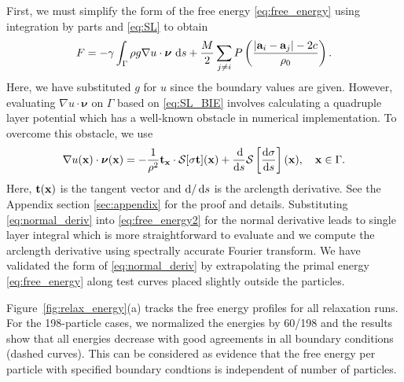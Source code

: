 \documentclass[prb,preprint,showpacs,preprintnumbers,amsmath,amssymb,longbibliography]{revtex4-1}
\renewcommand{\aa}{\mathbf{a}}
\newcommand{\DD}{\mathcal{D}}
\newcommand{\SSS}{\mathcal{S}}
\newcommand{\nnu}{\boldsymbol{\nu}}
\newcommand{\xx}{\mathbf{x}}
\begin{document}
First, we must simplify the
form of the free energy \eqref{eq:free_energy}
using integration by parts and \eqref{eq:SL}
to obtain
\begin{equation}
\label{eq:free_energy2}
F = -\gamma
\int_{\Gamma} \rho g \nabla u \cdot \nnu \,\dif s
+ \frac{M}{2}
\sum_{j \neq i} 
P\left(\frac{|\aa_i - \aa_j|-2c}{\rho_0}\right).
\end{equation}
%
Here, we have substituted $g$ for $u$ since the boundary values are given.
However, evaluating $\nabla u \cdot \nnu$ on $\Gamma$ based on \eqref{eq:SL_BIE}
involves calculating a quadruple layer potential which has a
well-known obstacle in numerical implementation.
To overcome this obstacle, we use
%
\begin{equation}
\label{eq:normal_deriv}
\nabla u(\xx) \cdot \nnu(\xx)=
-\frac{1}{\rho^2} {\bf t}_\xx\cdot \SSS[\sigma{\bf t}](\xx)
+ \frac{\dif}{\dif s}\SSS\left[\frac{\dif \sigma}{\dif s}\right](\xx), \quad \xx \in \Gamma.
\end{equation}
%
Here, ${\bf t}(\xx)$ is the tangent vector and $\dif/\dif s$ is the arclength derivative.
See the Appendix section \ref{sec:appendix} for the proof and details.
Substituting \eqref{eq:normal_deriv} into \eqref{eq:free_energy2} for the normal derivative
leads to single layer integral which is more straightforward to evaluate and we compute the
arclength derivative using spectrally accurate Fourier transform.
We have validated the form of \eqref{eq:normal_deriv} by extrapolating 
the primal energy \eqref{eq:free_energy} along test curves placed slightly
outside the particles. 

Figure~\ref{fig:relax_energy}(a) tracks the free energy profiles for all relaxation runs.
For the 198-particle cases, we normalized the energies by 60/198 and the results
show that all energies decrease with good agreements in all boundary conditions (dashed curves).
This can be considered as evidence that the free energy per particle with specified
boundary condtions is independent of number of particles.
\end{document}
